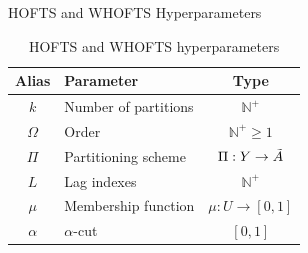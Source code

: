 \documentclass{beamer}
\begin{document}



\begin{frame}{HOFTS and WHOFTS Hyperparameters}
\small
\begin{table}[]
    \centering
    \begin{tabular}{|c|l|c|} \hline
        \textbf{Alias} & \textbf{Parameter} & \textbf{Type} \\ \hline
         $k$ & Number of partitions & $\mathbb{N}^+$  \\ \hline
         $\Omega$ & Order & $\mathbb{N}^+ \geq 1$  \\ \hline
         $\Pi$ & Partitioning scheme & $\Pi: Y \rightarrow \tilde{A}$  \\ \hline
         $L$ & Lag indexes & $\mathbb{N}^+$  \\ \hline
         $\mu$ & Membership function & $\mu: U \rightarrow [0,1]$  \\\hline
         $\alpha$ & $\alpha$-cut & $[0,1]$ \\ \hline
    \end{tabular}
    \caption{HOFTS and WHOFTS hyperparameters}
    \label{tab:hyperparameters}
\end{table}
\end{frame}

\note[itemize]{
\item 
}
\end{document}

